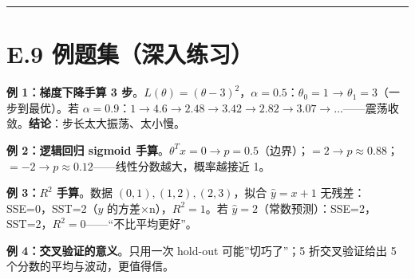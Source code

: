 \begin{center}\rule{0.5\linewidth}{0.5pt}\end{center}

\section{E.9
例题集（深入练习）}\label{e.9-ux4f8bux9898ux96c6ux6df1ux5165ux7ec3ux4e60}

\textbf{例 1：梯度下降手算 3
步}。\(L(\theta)=(\theta-3)^2\)，\(\alpha=0.5\)：\(\theta_0=1\) →
\(\theta_1=3\)（一步到最优）。若
\(\alpha=0.9\)：\(1\to 4.6\to 2.48\to 3.42\to 2.82\to 3.07\to …\)------震荡收敛。\textbf{结论}：步长太大振荡、太小慢。

\textbf{例 2：逻辑回归 sigmoid
手算}。\(\theta^Tx=0\to p=0.5\)（边界）；\(=2\to p\approx0.88\)；\(=-2\to p\approx0.12\)------线性分数越大，概率越接近
1。

\textbf{例 3：\(R^2\) 手算}。数据 \((0,1),(1,2),(2,3)\)，拟合
\(\hat y=x+1\) 无残差：SSE=0，SST=2（\(y\) 的方差×n），\(R^2=1\)。若
\(\hat y=2\)（常数预测）：SSE=2，SST=2，\(R^2=0\)------``不比平均更好''。

\begin{Shaded}
\begin{Highlighting}[]
\NormalTok{(r2\_score([}\NormalTok{,}\NormalTok{,}\NormalTok{], [}\NormalTok{,}\NormalTok{,}\NormalTok{]))   }
\NormalTok{(r2\_score([}\NormalTok{,}\NormalTok{,}\NormalTok{], [}\NormalTok{,}\NormalTok{,}\NormalTok{]))   }
\end{Highlighting}
\end{Shaded}

\textbf{例 4：交叉验证的意义}。只用一次 hold-out 可能''切巧了''；5
折交叉验证给出 5 个分数的平均与波动，更值得信。
